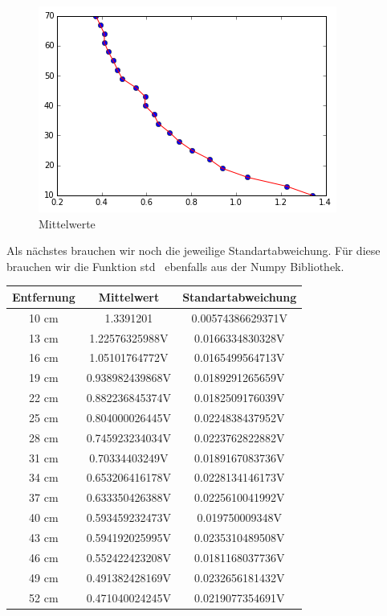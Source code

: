 \documentclass[TGAI_Laborbericht.tex]{subfiles}
\begin{document}
\begin{flushleft}
\begin{figure}[H]
\includegraphics[]{media/messwerte.png}
\caption{Mittelwerte}
\end{figure}
Als nächstes brauchen wir noch die jeweilige Standartabweichung. Für diese brauchen wir die Funktion \dq std\dq ~ ebenfalls aus der Numpy Bibliothek.
\begin{table}
\begin{tabular}{|c|c|c|}
\hline 
Entfernung & Mittelwert & Standartabweichung \\ 
\hline 
10 cm & 1.3391201
 & 0.00574386629371V
 \\ 
\hline 
13 cm & 1.22576325988V
 & 0.0166334830328V
 \\ 
\hline 
16 cm & 1.05101764772V
 & 0.0165499564713V
 \\ 
\hline 
19 cm & 0.938982439868V
 & 0.0189291265659V
 \\ 
\hline 
22 cm & 0.882236845374V
 & 0.0182509176039V
 \\ 
\hline 
25 cm & 0.804000026445V
 & 0.0224838437952V
 \\ 
\hline 
28 cm & 0.745923234034V
 & 0.0223762822882V
 \\ 
\hline 
31 cm & 0.70334403249V
 & 0.0189167083736V
 \\ 
\hline 
34 cm & 0.653206416178V
 & 0.0228134146173V
 \\ 
\hline 
37 cm & 0.633350426388V
 & 0.0225610041992V
 \\ 
\hline 
40 cm & 0.593459232473V
 & 0.019750009348V
 \\ 
\hline 
43 cm & 0.594192025995V
 & 0.0235310489508V
 \\ 
\hline 
46 cm & 0.552422423208V
 & 0.0181168037736V
 \\ 
\hline 
49 cm & 0.491382428169V
 & 0.0232656181432V
 \\ 
\hline 
52 cm & 0.471040024245V
 & 0.0219077354691V
 \\ 

\end{tabular}
\end{table}
\end{flushleft}
\end{document}
